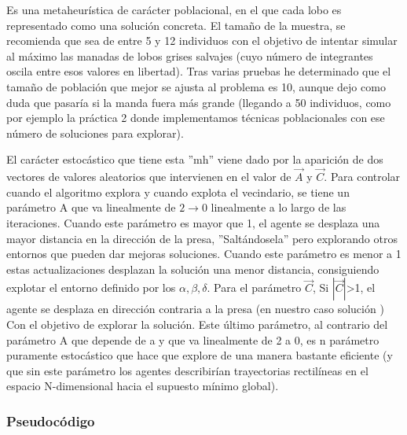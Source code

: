 \documentclass[a4paper]{report}
\begin{document}
Es una metaheurística de carácter poblacional, en el que cada lobo es representado como una solución concreta. El tamaño de la muestra, se recomienda que sea de entre 5 y 12 individuos con el objetivo de intentar simular al máximo las manadas de lobos grises salvajes (cuyo número de integrantes oscila entre esos valores en libertad). Tras varias pruebas he determinado que el tamaño de población que mejor se ajusta al problema es 10, aunque dejo como duda que pasaría si la manda fuera más grande (llegando a 50 individuos, como por ejemplo la práctica 2 donde implementamos técnicas poblacionales con ese número de soluciones para explorar).


El carácter estocástico que tiene esta ''mh'' viene dado por la aparición de dos vectores de valores aleatorios que intervienen en el valor de $\vec{A}$ y $\vec{C}$. Para controlar cuando el algoritmo explora y cuando explota el vecindario, se tiene un parámetro A que va linealmente de $2 \rightarrow 0$ linealmente a lo largo de las iteraciones. Cuando este parámetro es mayor que 1, el agente se desplaza una mayor distancia en la dirección de la presa, ''Saltándosela'' pero explorando otros entornos que pueden dar mejoras soluciones. Cuando este parámetro es menor a 1 estas actualizaciones desplazan la solución una menor distancia, consiguiendo explotar el entorno definido por los $\alpha,\beta,\delta$. Para el parámetro $\vec{C}$, Si $|\vec{C}|$>1, el agente se desplaza en dirección contraria a la presa (en nuestro caso solución ) Con el objetivo de explorar la solución. Este último parámetro, al contrario del parámetro A que depende de a y que va linealmente de 2 a 0, es n parámetro puramente estocástico que hace que explore de una manera bastante eficiente (y que sin este parámetro los agentes describirían trayectorias rectilíneas en el espacio N-dimensional hacia el supuesto mínimo global).


\subsubsection*{Pseudocódigo}
\end{document}
